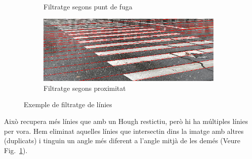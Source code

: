\documentclass[10pt,a4paper,twocolumn,twoside]{article}
\begin{document}
\begin{figure}[!h]
\begin{subfigure}{0.45\columnwidth}
		\caption{Filtratge segons punt de fuga}
	\end{subfigure}
	\quad
	\begin{subfigure}{0.45\columnwidth}
		\includegraphics[width=\linewidth]{figs/filtrat_proximitat}
		\caption{Filtratge segons proximitat}
	\end{subfigure}
	\caption{Exemple de filtratge de línies}
	\label{fig:vores}
\end{figure}

Això recupera més línies que amb un Hough restictiu, però hi ha múltiples línies per vora. Hem eliminat aquelles línies que intersectin dins la imatge amb altres (duplicats) i tinguin un angle més diferent a l'angle mitjà de les demés (Veure Fig.~\ref{fig:vores}).




\end{document}

